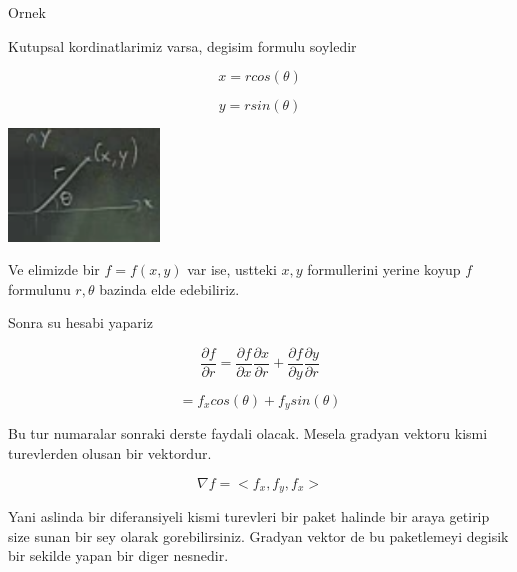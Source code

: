 \documentclass[12pt,fleqn]{article}
\begin{document}
Ornek

Kutupsal kordinatlarimiz varsa, degisim formulu soyledir

\[ x = r cos(\theta) \]

\[ y = r sin(\theta) \]

\includegraphics[height=3cm]{11_1.png}

Ve elimizde bir $f=f(x,y)$ var ise, ustteki $x,y$ formullerini yerine
koyup $f$ formulunu $r,\theta$ bazinda elde edebiliriz.

Sonra su hesabi yapariz

\[ \frac{\partial f}{\partial r} = 
\frac{\partial f}{\partial x}
\frac{\partial x}{\partial r} +
\frac{\partial f}{\partial y}
\frac{\partial y}{\partial r}
 \]

\[ = f_xcos(\theta) + f_y sin(\theta) \]

Bu tur numaralar sonraki derste faydali olacak. Mesela gradyan vektoru
kismi turevlerden olusan bir vektordur. 

\[ \nabla f = <f_x,f_y,f_x> \]

Yani aslinda bir diferansiyeli kismi turevleri bir paket halinde bir araya
getirip size sunan bir sey olarak gorebilirsiniz. Gradyan vektor de bu
paketlemeyi degisik bir sekilde yapan bir diger nesnedir. 
\end{document}
